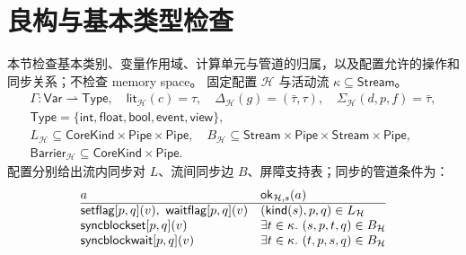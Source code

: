 \documentclass[UTF8,a4paper,11pt,fontset=fandol]{ctexart}
\newcommand{\kw}[1]{\ensuremath{\mathsf{#1}}}
\begin{document}
\clearpage
\section{良构与基本类型检查}
\label{sec:wf}
本节检查基本类别、变量作用域、计算单元与管道的归属，以及配置允许的操作和同步关系；不检查 memory space。
固定配置 $\mathcal H$ 与活动流 $\kappa\subseteq\mathsf{Stream}$。
\begingroup\small
\setlength{\abovedisplayskip}{5pt}\setlength{\belowdisplayskip}{5pt}
\[
\begin{gathered}
\Gamma:\mathsf{Var}\rightharpoonup\mathsf{Type},\quad \mathsf{lit}_{\mathcal H}(c)=\tau,
\quad\Delta_{\mathcal H}(g)=(\bar\tau,\tau),\quad\Sigma_{\mathcal H}(d,p,f)=\bar\tau,\\
\mathsf{Type}=\{\mathsf{int},\mathsf{float},\mathsf{bool},\mathsf{event},\mathsf{view}\},\\
L_{\mathcal H}\subseteq\mathsf{CoreKind}\times\mathsf{Pipe}\times\mathsf{Pipe},\quad
B_{\mathcal H}\subseteq\mathsf{Stream}\times\mathsf{Pipe}\times\mathsf{Stream}\times\mathsf{Pipe},\\
\mathsf{Barrier}_{\mathcal H}\subseteq\mathsf{CoreKind}\times\mathsf{Pipe}.
\end{gathered}
\]
\noindent 配置分别给出流内同步对 $L$、流间同步边 $B$、屏障支持表；同步的管道条件为：
\[
\begin{array}{@{}ll@{}}
a & \mathsf{ok}_{\mathcal H,s}(a)\\\hline
\kw{setflag}[p,q](v),\ \kw{waitflag}[p,q](v)
 & (\mathsf{kind}(s),p,q)\in L_{\mathcal H}\\
\kw{syncblockset}[p,q](v)
 & \exists t\in\kappa.\ (s,p,t,q)\in B_{\mathcal H}\\
\kw{syncblockwait}[p,q](v)
 & \exists t\in\kappa.\ (t,p,s,q)\in B_{\mathcal H}
\end{array}
\]
\end{document}
